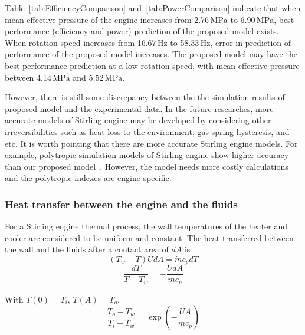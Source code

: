 Table~\ref{tab:EfficiencyComparison} and~\ref{tab:PowerComparison} indicate that when mean effective pressure of the engine increases from 2.76$\,\mathrm{MPa}$ to 6.90$\,\mathrm{MPa}$, best performance (efficiency and power) prediction of the proposed model exists. When rotation speed increases from 16.67$\,\mathrm{Hz}$ to 58.33$\,\mathrm{Hz}$, error in prediction of performance of the proposed model increases. The proposed model may have the best performance prediction at a low rotation speed, with mean effective pressure between 4.14$\,\mathrm{MPa}$ and 5.52$\,\mathrm{MPa}$.

However, there is still some discrepancy between the the simulation results of proposed model and the experimental data. In the future researches, more accurate models of Stirling engine may be developed by considering other irreversibilities such as heat loss to the environment, gas spring hysteresis, and etc. It is worth pointing that there are more accurate Stirling engine models. For example, polytropic simulation models of Stirling engine show higher accuracy than our proposed model~\cite{Hosseinzade2015, Babaelahi2015}. However, the model needs more costly calculations and the polytropic indexes are engine-specific.

\subsubsection{Heat transfer between the engine and the fluids}

For a Stirling engine thermal process, the wall temperatures of the heater and cooler are considered to be uniform and constant. The heat transferred between the wall and the fluids after a contact area of $dA$ is
\begin{equation}
	(T_w-T)UdA = \dot{m}c_pdT
\end{equation}
\begin{equation}
	\frac{dT}{T-T_w}=-\frac{UdA}{\dot{m}c_p}
\end{equation}

With $T(0)=T_i$, $T(A)=T_o$,
\begin{equation}
	\frac{T_o-T_w}{T_i-T_w}=\exp(-\frac{UA}{\dot{m}c_p})
\end{equation}

